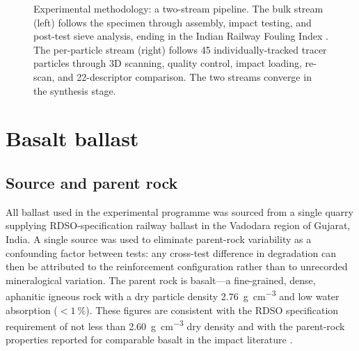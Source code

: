 \begin{figure}[ht]
\caption{Experimental methodology: a two-stream pipeline. The bulk stream
         (left) follows the specimen through assembly, impact testing,
         and post-test sieve analysis, ending in the Indian Railway
         Fouling Index \FIIN. The per-particle stream (right) follows 45
         individually-tracked tracer particles through 3D scanning,
         quality control, impact loading, re-scan, and 22-descriptor
         comparison. The two streams converge in the synthesis stage.}
\label{fig:meth-flowchart}
\end{figure}

\section{Basalt ballast}
\label{sec:meth-materials}

\subsection{Source and parent rock}
\label{sec:meth-source}

All ballast used in the experimental programme was sourced from a single
quarry supplying \gls{RDSO}-specification railway ballast in the Vadodara
region of Gujarat, India. A single source was used to eliminate parent-rock
variability as a confounding factor between tests: any cross-test difference
in degradation can then be attributed to the reinforcement configuration
rather than to unrecorded mineralogical variation. The parent rock is
basalt---a fine-grained, dense, aphanitic igneous rock with a dry particle
density \SI{2.76}{\gram\per\centi\metre\cubed} and low water absorption
(\(<\SI{1}{\percent}\)). These figures are consistent with the \gls{RDSO}
specification \citep{RDSO2023} requirement of not less than
\SI{2.60}{\gram\per\centi\metre\cubed} dry density and with the parent-rock
properties reported for comparable basalt in the impact literature
\citep{Koohmishi2020, Zhang2023}.

